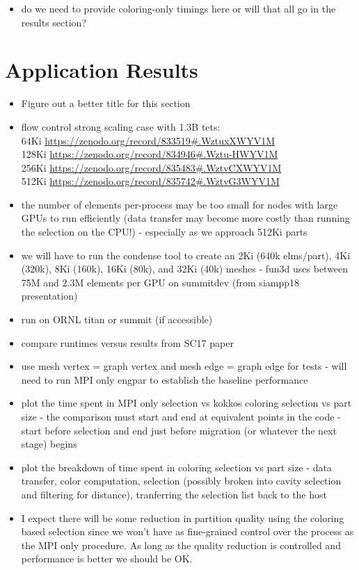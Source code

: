 \documentclass[graybox]{svmult}
\begin{document}
\begin{itemize}
  \item do we need to provide coloring-only timings here or will that all go in
    the results section?
\end{itemize}

\section{Application Results} \label{sec:results}

\begin{itemize}
  \item Figure out a better title for this section
  \item flow control strong scaling case with 1.3B tets: \\
64Ki \url{https://zenodo.org/record/833519#.WztuxXWYV1M} \\
128Ki \url{https://zenodo.org/record/834946#.Wztu-HWYV1M} \\
256Ki \url{https://zenodo.org/record/835483#.WztvCXWYV1M} \\
512Ki \url{https://zenodo.org/record/835742#.WztvG3WYV1M}
  \item the number of elements per-process may be too small for nodes with large GPUs to run efficiently (data transfer may become more costly than running the selection on the CPU!) - especially as we approach 512Ki parts
  \item we will have to run the condense tool to create an 2Ki (640k elms/part),
    4Ki (320k), 8Ki (160k), 16Ki (80k), and 32Ki (40k) meshes -
    fun3d uses between 75M and 2.3M elements per GPU on summitdev (from siampp18
    presentation)
  \item run on ORNL titan or summit (if accessible)
  \item compare runtimes versus results from SC17 paper~\cite{engparSC17}
  \item use mesh vertex = graph vertex and mesh edge = graph edge for tests -
    will need to run MPI only engpar to establish the baseline performance
  \item plot the time spent in MPI only selection vs kokkos coloring selection
    vs part size - the comparison must start and end at equivalent points in the
    code - start before selection and end just before migration (or whatever the
    next stage) begins
  \item plot the breakdown of time spent in coloring selection vs part size -
    data transfer, color computation, selection (possibly broken into cavity
    selection and filtering for distance), tranferring the selection list
    back to the host
  \item I expect there will be some reduction in partition quality using the
    coloring based selection since we won't have as fine-grained control over
    the process as the MPI only procedure.  As long as the quality reduction is
    controlled and performance is better we should be OK.
\end{itemize}
\end{document}
